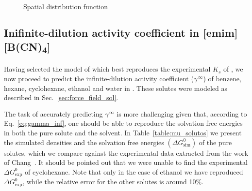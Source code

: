 \documentclass[3p,twocolumn]{elsarticle}
\begin{document}
\begin{figure}
\centering
{}

\caption{Spatial distribution function}
\label{fig:sdf}
\end{figure}

\subsection{Inifinite-dilution activity coefficient in [emim] [B(CN)\textsubscript{4}]}
\label{sec:act_results}

Having selected the model of \ce{[emim][B(CN)_4]} which best reproduces the experimental $K_s$ of , we now proceed to predict the infinite-dilution activity coefficient ($\gamma^{\, \infty}$) of benzene, hexane, cyclohexane, ethanol and water in \ce{[emim][B(CN)_4]}. These solutes were modeled as described in Sec.~\ref{sec:force_field_sol}.

The task of accurately predicting $\gamma^{\, \infty}$ is more challenging given that, according to Eq.~\ref{eq:gamma_inf}, one should be able to reproduce the solvation free energies in both the pure solute and the solvent. In Table~\ref{table:mu_solutos} we present the simulated densities and the solvation free energies  $(\Delta G^{0}_{\text{sim}})$ of the pure solutes, which we compare against the experimental data extracted from the work of Chang~\cite{Chang_2009}. It should be pointed out that we were unable to find the experimental $\Delta G^{0}_\text{exp}$ of cyclohexane. Note that only in the case of ethanol we have reproduced $\Delta G^{0}_\text{exp}$, while the relative error for the other solutes is around 10\%.
\end{document}
